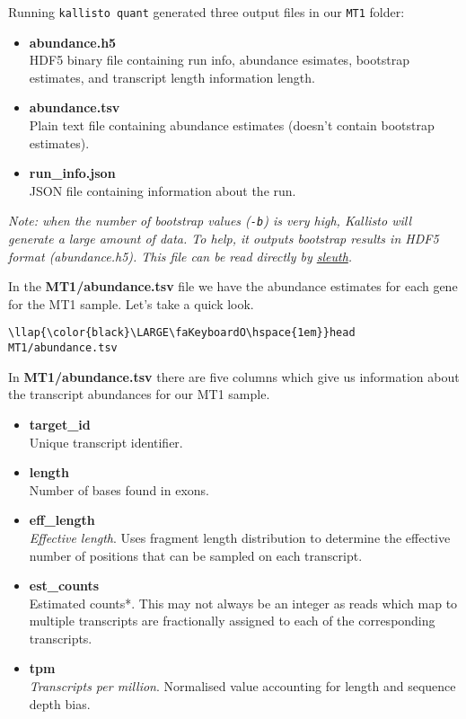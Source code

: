 \documentclass[11pt]{article}
\begin{document}
    Running \texttt{kallisto\ quant} generated three output files in our
\texttt{MT1} folder:

\begin{itemize}
\item
  \textbf{abundance.h5}\\
  HDF5 binary file containing run info, abundance esimates, bootstrap
  estimates, and transcript length information length.
\item
  \textbf{abundance.tsv}\\
  Plain text file containing abundance estimates (doesn't contain
  bootstrap estimates).
\item
  \textbf{run\_info.json}\\
  JSON file containing information about the run.
\end{itemize}

\textit{Note: when the number of bootstrap values (\texttt{-b}) is very
high, Kallisto will generate a large amount of data. To help, it outputs
bootstrap results in HDF5 format (abundance.h5). This file can be read
directly by \href{https://pachterlab.github.io/sleuth}{sleuth}.}

In the \textbf{MT1/abundance.tsv} file we have the abundance estimates
for each gene for the MT1 sample. Let's take a quick look.





\begin{terminalinput}
\begin{Verbatim}[commandchars=\\\{\}]
\llap{\color{black}\LARGE\faKeyboardO\hspace{1em}}head MT1/abundance.tsv
\end{Verbatim}
\end{terminalinput}



    In \textbf{MT1/abundance.tsv} there are five columns which give us
information about the transcript abundances for our MT1 sample.

\begin{itemize}
\item
  \textbf{target\_id}\\
  Unique transcript identifier.
\item
  \textbf{length}\\
  Number of bases found in exons.
\item
  \textbf{eff\_length}\\
  \textit{Effective length}. Uses fragment length distribution to
  determine the effective number of positions that can be sampled on
  each transcript.
\item
  \textbf{est\_counts}\\
  Estimated counts*. This may not always be an integer as reads which
  map to multiple transcripts are fractionally assigned to each of the
  corresponding transcripts.
\item
  \textbf{tpm}\\
  \textit{Transcripts per million}. Normalised value accounting for length
  and sequence depth bias.
\end{itemize}
\end{document}
